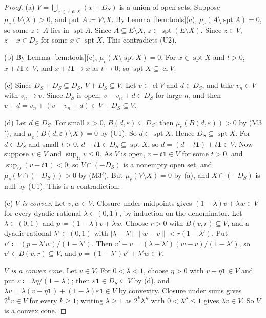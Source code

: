 \documentclass[11pt]{article}
\newcommand{\one}{\mathbf{1}}
\DeclareMathOperator{\cl}{cl}
\DeclareMathOperator{\spt}{spt}
\theoremstyle{plain}
\theoremstyle{definition}
\theoremstyle{remark}
\begin{document}
\begin{proof}
(a) $V=\bigcup_{x\in\spt X}(x+D_S)$ is a union of open sets. Suppose $\mu_c(V\setminus X)>0$,
and put $A\coloneqq V\setminus X$. By Lemma~\ref{lem:tools}(c), $\mu_c(A\setminus\spt A)=0$, so
some $z\in A$ lies in $\spt A$. Since $A\subseteq E\setminus X$, $z\in\spt(E\setminus X)$.
Since $z\in V$, $z-x\in D_S$ for some $x\in\spt X$. This contradicts (U2).

(b) By Lemma~\ref{lem:tools}(c), $\mu_c(X\setminus\spt X)=0$. For $x\in\spt X$ and $t>0$,
$x+t\one\in V$, and $x+t\one\to x$ as $t\to0$; so $\spt X\subseteq\cl V$.

(c) Since $D_S+D_S\subseteq D_S$, $V+D_S\subseteq V$. Let $v\in\cl V$ and $d\in D_S$, and take
$v_n\in V$ with $v_n\to v$. Since $D_S$ is open, $v-v_n+d\in D_S$ for large $n$, and then
$v+d=v_n+(v-v_n+d)\in V+D_S\subseteq V$.

(d) Let $d\in D_S$. For small $\varepsilon>0$, $B(d,\varepsilon)\subseteq D_S$; then
$\mu_c(B(d,\varepsilon))>0$ by (M3$'$), and $\mu_c(B(d,\varepsilon)\setminus X)=0$ by (U1). So
$d\in\spt X$. Hence $D_S\subseteq\spt X$. For $d\in D_S$ and small $t>0$,
$d-t\one\in D_S\subseteq\spt X$, so $d=(d-t\one)+t\one\in V$. Now suppose $v\in V$ and
$\sup_\Omega v\le0$. As $V$ is open, $v-t\one\in V$ for some $t>0$, and $\sup_\Omega(v-t\one)
<0$; so $V\cap(-D_S)$ is a nonempty open set, and $\mu_c(V\cap(-D_S))>0$ by (M3$'$). But
$\mu_c(V\setminus X)=0$ by (a), and $X\cap(-D_S)$ is null by (U1). This is a contradiction.

(e) \emph{$V$ is convex.} Let $v,w\in V$. Closure under midpoints gives $(1-\lambda)v+\lambda w
\in V$ for every dyadic rational $\lambda\in(0,1)$, by induction on the denominator. Let
$\lambda\in(0,1)$ and $p\coloneqq(1-\lambda)v+\lambda w$. Choose $r>0$ with $B(v,r)\subseteq
V$, and a dyadic rational $\lambda'\in(0,1)$ with $|\lambda-\lambda'|\,\|w-v\|<r(1-\lambda')$.
Put $v'\coloneqq(p-\lambda'w)/(1-\lambda')$. Then $v'-v=(\lambda-\lambda')(w-v)/(1-\lambda')$,
so $v'\in B(v,r)\subseteq V$, and $p=(1-\lambda')v'+\lambda'w\in V$.

\emph{$V$ is a convex cone.} Let $v\in V$. For $0<\lambda<1$, choose $\eta>0$ with
$v-\eta\one\in V$ and put $\varepsilon\coloneqq\lambda\eta/(1-\lambda)$; then $\varepsilon\one
\in D_S\subseteq V$ by (d), and $\lambda v=\lambda(v-\eta\one)+(1-\lambda)\varepsilon\one\in V$
by convexity. Closure under sums gives $2^kv\in V$ for every $k\ge1$; writing $\lambda\ge1$ as
$2^k\lambda''$ with $0<\lambda''\le1$ gives $\lambda v\in V$. So $V$ is a convex cone.


\end{proof}
\end{document}
